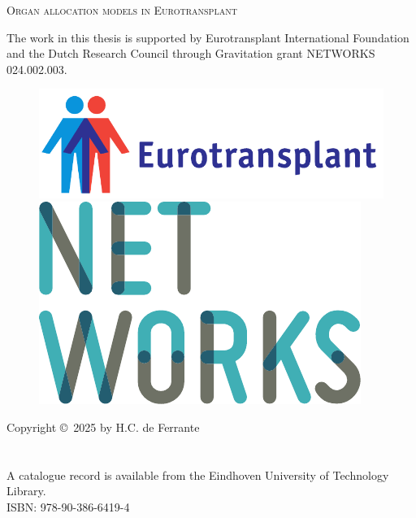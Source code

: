 \documentclass[11pt,twoside,]{book}
\begin{document}
\frontmatter
\thispagestyle{empty}
\def\drop{.1\textheight}

\vspace*{\drop}
\begin{center}
\Huge \textsc{Organ allocation models in Eurotransplant}
\end{center}

\clearpage
\thispagestyle{empty}
\begingroup %
\small
\setlength{\parskip}{\baselineskip} %
\setlength\parindent{0pt} %
The work in this thesis is supported by Eurotransplant International Foundation
and the Dutch Research Council through Gravitation grant NETWORKS 024.002.003. 
\vspace{.5cm}
\begin{figure}[h]
    \centering
    \begin{minipage}{0.50\textwidth}
        \centering
        \includegraphics[width=\textwidth]{figures/logo_eurotransplant.pdf}
    \end{minipage}
    \hfill
    \begin{minipage}{0.25\textwidth}
        \centering
        \includegraphics[width=\textwidth]{figures/logo_networks.pdf}
      
    \end{minipage}

\end{figure}
\vfill
Copyright \copyright \ 2025 by H.C. de Ferrante
\\
\\
\\A catalogue record is available from the Eindhoven University of Technology Library. \\ISBN: 978-90-386-6419-4
\end{document}
